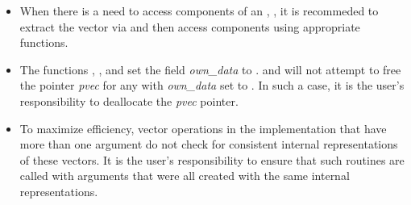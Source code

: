 \begin{itemize}
                                        
\item
  When there is a need to access components of an , , 
  it is recommeded to extract the {\cuda} vector via       
   and then access components using 
  appropriate {\cuda} functions.        
                                                               
\item
  {\warn}The functions , , and
   set the field {\em own\_data} to .   
   and 
  will not attempt to free the pointer {\em pvec} for any  with
  {\em own\_data} set to . In such a case, it is the user's responsibility to
  deallocate the {\em pvec} pointer.

\item
  {\warn}To maximize efficiency, vector operations in the {\nveccuda} implementation
  that have more than one  argument do not check for
  consistent internal representations of these vectors. It is the user's 
  responsibility to ensure that such routines are called with 
  arguments that were all created with the same internal representations.

\end{itemize}

